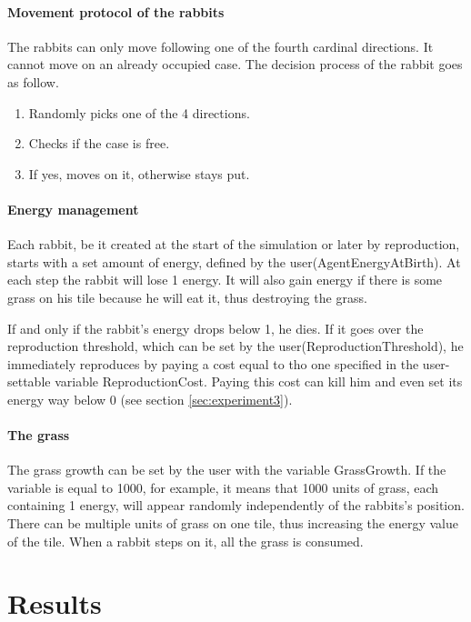 \documentclass[11pt]{article}
\begin{document}
\paragraph{Movement protocol of the rabbits} The rabbits can only move following one of the fourth cardinal directions. It cannot move on an already occupied case. The decision process of the rabbit goes as follow.

\begin{enumerate}
  \item Randomly picks one of the 4 directions.
  \item Checks if the case is free.
  \item If yes, moves on it, otherwise stays put.
\end{enumerate}

\paragraph{Energy management} Each rabbit, be it created at the start of the simulation or later by reproduction, starts with a set amount of energy, defined by the user(AgentEnergyAtBirth). At each step the rabbit will lose 1 energy. It will also gain energy if there is some grass on his tile because he will eat it, thus destroying the grass.

If and only if the rabbit's energy drops below 1, he dies. If it goes over the reproduction threshold, which can be set by the user(ReproductionThreshold), he immediately reproduces by paying a cost equal to tho one specified in the user-settable variable ReproductionCost. Paying this cost can kill him and even set its energy way below 0 (see section \ref{sec:experiment3}).

\paragraph{The grass} The grass growth can be set by the user with the variable GrassGrowth. If the variable is equal to 1000, for example, it means that 1000 units of grass, each containing 1 energy, will appear randomly independently of the rabbits's position. There can be multiple units of grass on one tile, thus increasing the energy value of the tile. When a rabbit steps on it, all the grass is consumed.

\section{Results}
\end{document}

